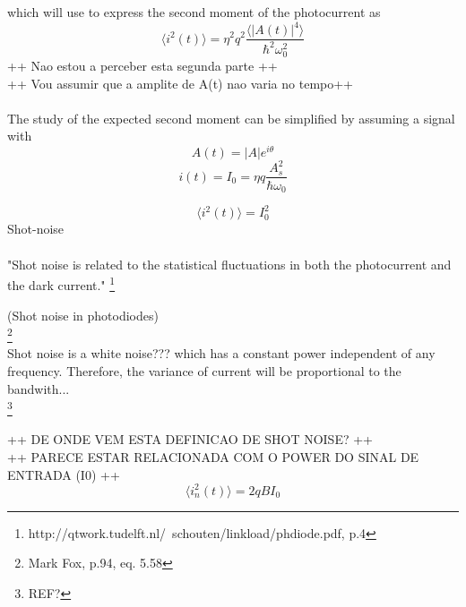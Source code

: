 \begin{bibunit}[plain]
which will use to express the second moment of the photocurrent as
\begin{equation}
	\langle i^2(t) \rangle = \eta^2 q^2 \frac{\langle |A(t)|^4 \rangle }{\hbar^2 \omega_0^2}
\end{equation}
%
++ Nao estou a perceber esta segunda parte ++\\
++ Vou assumir que a amplite de A(t) nao varia no tempo++\\
\\
The study of the expected second moment can be simplified by assuming a signal with 
%
\begin{equation}
	A(t) = |A| e^{i \theta}
\end{equation}
%
\begin{equation}
	i(t) = I_0 = \eta q \frac{A_s^2}{\hbar \omega_0}
\end{equation}

\begin{equation}
	\langle i^2(t) \rangle = I_0^2
\end{equation}
Shot-noise\\
\\
"Shot noise is related to the statistical fluctuations in both the photocurrent and the dark current."
\footnote{http://qtwork.tudelft.nl/~schouten/linkload/phdiode.pdf, p.4}

(Shot noise in photodiodes)\\
\footnote{Mark Fox, p.94, eq. 5.58}
\\
Shot noise is a white noise??? which has a constant power independent of any frequency. Therefore, the variance of current will be proportional to the bandwith...\\
\footnote{REF?}

++ DE ONDE VEM ESTA DEFINICAO DE SHOT NOISE? ++\\
++ PARECE ESTAR RELACIONADA COM O POWER DO SINAL DE ENTRADA (I0) ++\\

\begin{equation}
	\langle i_n^2(t) \rangle = 2 q B I_0
\end{equation}


\end{bibunit}
